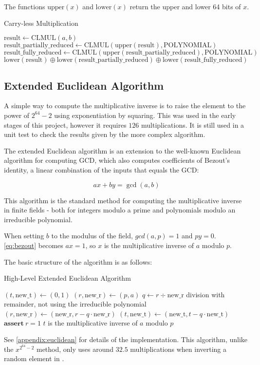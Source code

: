 The functions $\text{upper}(x)$ and $\text{lower}(x)$ return the upper and lower 64 bits of $x$.

\begin{algorithm}
\caption{Carry-less Multiplication}
\begin{algorithmic}
\State $\text{result} \gets \text{CLMUL}(a, b)$
\State $\text{result\_partially\_reduced} \gets \text{CLMUL}(\text{upper}(\text{result}), \text{POLYNOMIAL})$
\State $\text{result\_fully\_reduced} \gets \text{CLMUL}(\text{upper}(\text{result\_partially\_reduced}), \text{POLYNOMIAL})$
\State \Return $\text{lower}(\text{result}) \oplus \text{lower}(\text{result\_partially\_reduced}) \oplus \text{lower}(\text{result\_fully\_reduced})$
\EndFunction
\end{algorithmic}
\end{algorithm}

\subsection{Extended Euclidean Algorithm}

A simple way to compute the multiplicative inverse is to raise the element to the power of $2^{64} - 2$ using exponentiation by squaring.
This was used in the early stages of this project, however it requires $126$ multiplications.
It is still used in a unit test to check the results given by the more complex algorithm.

The extended Euclidean algorithm is an extension to the well-known Euclidean algorithm for computing GCD, which also computes coefficients of Bezout's identity, a linear combination of the inputs that equals the GCD:

\begin{equation}
ax + by = \gcd(a, b) \label{eq:bezout}
\end{equation}

This algorithm is the standard method for computing the multiplicative inverse in finite fields - both for integers modulo a prime and polynomials modulo an irreducible polynomial.

When setting $b$ to the modulus of the field, $gcd(a, p) = 1$ and $py = 0$. \ref{eq:bezout} becomes $ax = 1$, so $x$ is the multiplicative inverse of $a$ modulo $p$.

The basic structure of the algorithm is as follows:

\begin{algorithm}
    \caption{High-Level Extended Euclidean Algorithm}
    \begin{algorithmic}
        \State $(t, \text{new\_t}) \gets (0, 1)$
        \State $(r, \text{new\_r}) \gets (p, a)$
            \State $q \gets r \div \text{new\_r}$ \Comment division with remainder, not using the irreducible polynomial
            \State $(r, \text{new\_r}) \gets (\text{new\_r}, r - q \cdot \text{new\_r})$
            \State $(t, \text{new\_t}) \gets (\text{new\_t}, t - q \cdot \text{new\_t})$
        \EndWhile
        \State $\textbf{assert}\ r = 1$
        \Comment $t$ is the multiplicative inverse of $a$ modulo $p$
    \end{algorithmic}
\end{algorithm}

See \ref{appendix:euclidean} for details of the implementation.
This algorithm, unlike the $x^{2^{64} - 2}$ method, only uses around $32.5$ multiplications when inverting a random element in .
